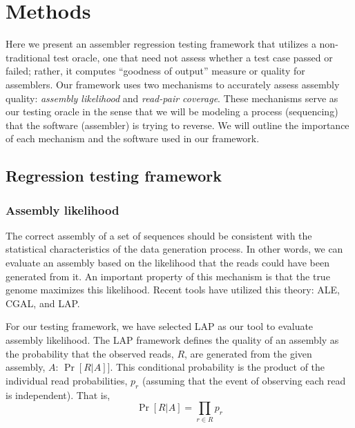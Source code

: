 \section{Methods}
\label{methods}

Here we present an assembler regression testing framework that utilizes a non-traditional test oracle, one that need not assess whether a test case passed or failed; rather, it computes ``goodness of output'' measure or quality for assemblers.
Our framework uses two mechanisms to accurately assess assembly quality: \emph{assembly likelihood} and \emph{read-pair coverage}.
These mechanisms serve as our testing oracle in the sense that we will be modeling a process (sequencing) that the software (assembler) is trying to reverse.
We will outline the importance of each mechanism and the software used in our framework.


\subsection{Regression testing framework}
\subsubsection{Assembly likelihood}

The correct assembly of a set of sequences should be consistent with the statistical characteristics of the data generation process\cite{myers1995toward}.
In other words, we can evaluate an assembly based on the likelihood that the reads could have been generated from it.
An important property of this mechanism is that the true genome maximizes this likelihood\cite{LAP}.
Recent tools have utilized this theory: ALE\cite{clark2013ale}, CGAL\cite{rahman2013cgal}, and LAP\cite{LAP}.

For our testing framework, we have selected LAP as our tool to evaluate assembly likelihood.
The LAP framework defines the quality of an assembly as the probability that the observed reads, $R$, are generated from the given assembly, $A$: $\Pr[R|A]]$.
This conditional probability is the product of the individual read probabilities, $p_r$ (assuming that the event of observing each read is independent).  That is,
\begin{equation}
  \label{probability_reads_given_assembly}
  \Pr[R \vert A]=\prod_{r \in R} p_r
\end{equation}

